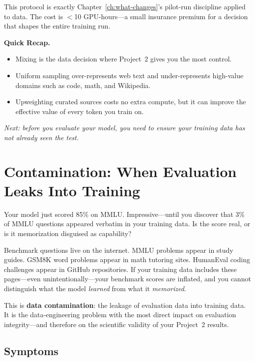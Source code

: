 This protocol is exactly Chapter~\ref{ch:what-changes}'s pilot-run discipline applied to data. The cost is $<$10 GPU-hours---a small insurance premium for a decision that shapes the entire training run.

\begin{quickrecap}
\textbf{Quick Recap.}
\begin{itemize}[nosep,leftmargin=1.5em]
  \item Mixing is the data decision where Project~2 gives you the most control.
  \item Uniform sampling over-represents web text and under-represents high-value domains such as code, math, and Wikipedia.
  \item Upweighting curated sources costs no extra compute, but it can improve the effective value of every token you train on.
\end{itemize}
\textit{Next: before you evaluate your model, you need to ensure your training data has not already seen the test.}
\end{quickrecap}


\section{Contamination: When Evaluation Leaks Into Training}
\label{sec:contamination}

Your model just scored 85\% on MMLU. Impressive---until you discover that 3\% of MMLU questions appeared verbatim in your training data. Is the score real, or is it memorization disguised as capability?

Benchmark questions live on the internet. MMLU problems appear in study guides. GSM8K word problems appear in math tutoring sites. HumanEval coding challenges appear in GitHub repositories. If your training data includes these pages---even unintentionally---your benchmark scores are inflated, and you cannot distinguish what the model \emph{learned} from what it \emph{memorized}.

This is \textbf{data contamination}: the leakage of evaluation data into training data. It is the data-engineering problem with the most direct impact on evaluation integrity---and therefore on the scientific validity of your Project~2 results.

\subsection{Symptoms}

